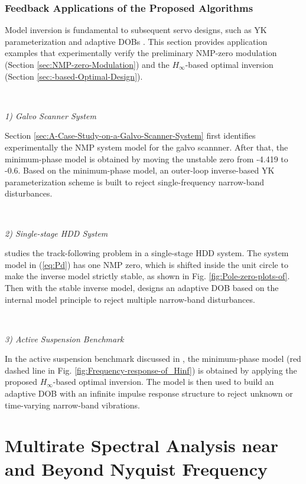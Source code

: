\documentclass [11pt, proquest] {uwthesis}[2020/02/24]
\begin{document}
\subsection{\label{subsec:Feedback-applications-of}Feedback Applications of
the Proposed Algorithms}

Model inversion is fundamental to subsequent servo designs, such as
YK parameterization and adaptive DOBs \cite{jiang2019local,Ohnishi1993,chen2011minimum,apte2019disturbance,wang2017tutorial}.
This section provides application examples that experimentally verify
the preliminary NMP-zero modulation (Section \ref{sec:NMP-zero-Modulation})
and the $H_{\infty}$-based optimal inversion (Section \ref{sec:-based-Optimal-Design}).

\

\noindent \emph{1) Galvo Scanner System}

Section \ref{sec:A-Case-Study-on-a-Galvo-Scanner-System} first identifies experimentally
the NMP system model for the galvo scannner. After that, the minimum-phase model is obtained
by moving the unstable zero from -4.419 to -0.6. Based on the minimum-phase
model, an outer-loop inverse-based
YK parameterization scheme is built to reject single-frequency narrow-band
disturbances. 

\

\noindent \emph{2) Single-stage HDD System}

\cite{chen2011minimum} studies the track-following problem in a single-stage
HDD system. The system model in (\ref{eq:Pd}) has one NMP zero, which
is shifted inside the unit circle to make the inverse model strictly
stable, as shown in Fig. \ref{fig:Pole-zero-plots-of}. Then with
the stable inverse model, \cite{chen2011minimum} designs an adaptive
DOB based on the internal model principle to reject
multiple narrow-band disturbances.

\

\noindent \emph{3) Active Suspension Benchmark}

In the active suspension benchmark discussed in \cite{chen_selective_2013-1},
the minimum-phase model (red dashed line in Fig. \ref{fig:Frequency-response-of_Hinf})
is obtained by applying the proposed $H_{\infty}$-based optimal inversion.
The model is then used to build an adaptive DOB with
an infinite impulse response structure to reject unknown or time-varying
narrow-band vibrations.



\chapter{Multirate Spectral Analysis near and Beyond Nyquist Frequency} \label{chap:Spectral-Analysis}
\end{document}
